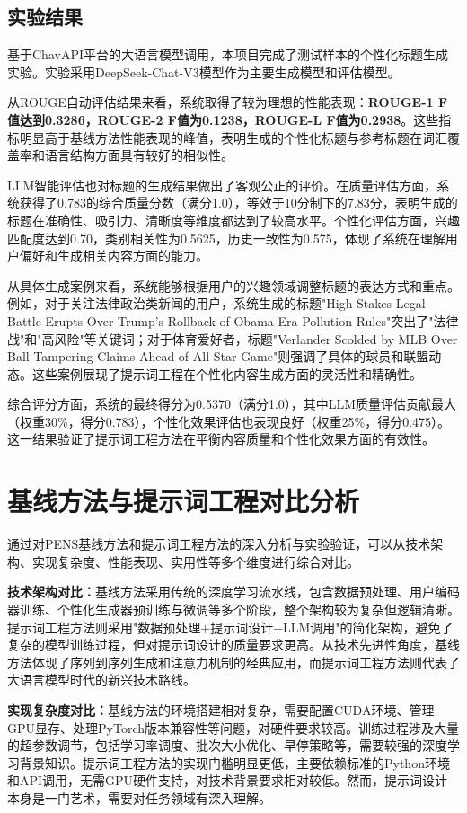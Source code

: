 \documentclass[10pt,a4paper]{article}
\begin{document}
\subsection{实验结果}
基于ChavAPI平台的大语言模型调用，本项目完成了测试样本的个性化标题生成实验。实验采用DeepSeek-Chat-V3模型作为主要生成模型和评估模型。

从ROUGE自动评估结果来看，系统取得了较为理想的性能表现：\textbf{ROUGE-1 F值达到0.3286，ROUGE-2 F值为0.1238，ROUGE-L F值为0.2938}。这些指标明显高于基线方法性能表现的峰值，表明生成的个性化标题与参考标题在词汇覆盖率和语言结构方面具有较好的相似性。

LLM智能评估也对标题的生成结果做出了客观公正的评价。在质量评估方面，系统获得了0.783的综合质量分数（满分1.0），等效于10分制下的7.83分，表明生成的标题在准确性、吸引力、清晰度等维度都达到了较高水平。个性化评估方面，兴趣匹配度达到0.70，类别相关性为0.5625，历史一致性为0.575，体现了系统在理解用户偏好和生成相关内容方面的能力。

从具体生成案例来看，系统能够根据用户的兴趣领域调整标题的表达方式和重点。例如，对于关注法律政治类新闻的用户，系统生成的标题"High-Stakes Legal Battle Erupts Over Trump's Rollback of Obama-Era Pollution Rules"突出了"法律战"和"高风险"等关键词；对于体育爱好者，标题"Verlander Scolded by MLB Over Ball-Tampering Claims Ahead of All-Star Game"则强调了具体的球员和联盟动态。这些案例展现了提示词工程在个性化内容生成方面的灵活性和精确性。

综合评分方面，系统的最终得分为0.5370（满分1.0），其中LLM质量评估贡献最大（权重30\%，得分0.783），个性化效果评估也表现良好（权重25\%，得分0.475）。这一结果验证了提示词工程方法在平衡内容质量和个性化效果方面的有效性。

\section{基线方法与提示词工程对比分析}
通过对PENS基线方法和提示词工程方法的深入分析与实验验证，可以从技术架构、实现复杂度、性能表现、实用性等多个维度进行综合对比。

\textbf{技术架构对比：}基线方法采用传统的深度学习流水线，包含数据预处理、用户编码器训练、个性化生成器预训练与微调等多个阶段，整个架构较为复杂但逻辑清晰。提示词工程方法则采用"数据预处理+提示词设计+LLM调用"的简化架构，避免了复杂的模型训练过程，但对提示词设计的质量要求更高。从技术先进性角度，基线方法体现了序列到序列生成和注意力机制的经典应用，而提示词工程方法则代表了大语言模型时代的新兴技术路线。

\textbf{实现复杂度对比：}基线方法的环境搭建相对复杂，需要配置CUDA环境、管理GPU显存、处理PyTorch版本兼容性等问题，对硬件要求较高。训练过程涉及大量的超参数调节，包括学习率调度、批次大小优化、早停策略等，需要较强的深度学习背景知识。提示词工程方法的实现门槛明显更低，主要依赖标准的Python环境和API调用，无需GPU硬件支持，对技术背景要求相对较低。然而，提示词设计本身是一门艺术，需要对任务领域有深入理解。
\end{document}
